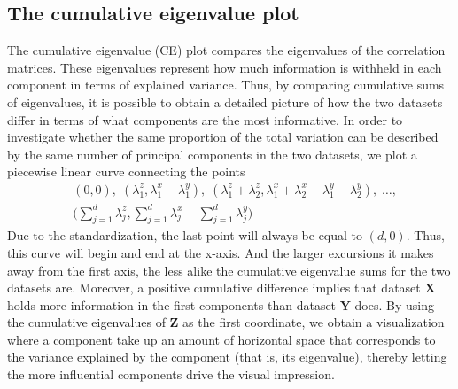 \documentclass[]{interact}
\theoremstyle{plain}%
\theoremstyle{definition}
\theoremstyle{remark}
\begin{document}
\subsection{The cumulative eigenvalue plot}
The cumulative eigenvalue (CE) plot compares the eigenvalues of the correlation matrices. These eigenvalues represent how much information is withheld in each component in terms of explained variance. Thus, by comparing cumulative sums of eigenvalues, it is possible to obtain a detailed picture of how the two datasets differ in terms of what components are the most informative. In order to investigate whether the same proportion of the total variation can be described by the same number of principal components in the two datasets, we plot a piecewise linear curve connecting the points
\begin{align*}
&(0,0), \;
(\lambda_1^z,\lambda_{1}^x-\lambda_{1}^y), \;
(\lambda_1^z + \lambda_2^z,\lambda_{1}^x+\lambda_{2}^x-\lambda_{1}^y-\lambda_{2}^y), \;
\ldots, \\
&\bigg( \sum_{j=1}^d \lambda_j^z, \sum_{j=1}^d \lambda_{j}^x - \sum_{j=1}^d \lambda_{j}^y \bigg)
\end{align*}
Due to the standardization, the last point will always be equal to $(d,0)$. Thus, this curve will begin and end at the x-axis. And the larger excursions it makes away from the  first axis, the less alike the cumulative eigenvalue sums for the two datasets are. Moreover, a positive cumulative difference implies that dataset $\mathbf{X}$ holds more information in the first components than dataset $\mathbf{Y}$ does. By using the cumulative eigenvalues of $\mathbf{Z}$ as the first coordinate, we obtain a visualization where a component take up an amount of horizontal space that corresponds to the variance explained by the component (that is, its eigenvalue), thereby letting the more influential components drive the visual impression. 

\end{document}
